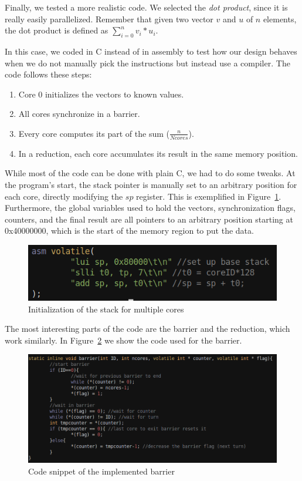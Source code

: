 Finally, we tested a more realistic code.
We selected the \textit{dot product}, since it is really easily parallelized.
Remember that given two vector $v$ and $u$ of $n$ elements, the dot product is defined as $\sum_{i=0}^{n}{v_{i} * u_{i}}$.

In this case, we coded in C instead of in assembly to test how our design behaves when we do not manually pick the instructions but instead use a compiler.
The code follows these steps:
\begin{enumerate}
	\item Core 0 initializes the vectors to known values.
	\item All cores synchronize in a barrier.
	\item Every core computes its part of the sum ($\frac{n}{Ncores}$).
	\item In a reduction, each core accumulates its result in the same memory position.
\end{enumerate}

While most of the code can be done with plain C, we had to do some tweaks.
At the program's start, the stack pointer is manually set to an arbitrary position for each core, directly modifying the $sp$ register.
This is exemplified in Figure~\ref{stackfig}.
Furthermore, the global variables used to hold the vectors, synchronization flags, counters, and the final result are all pointers to an arbitrary position starting at 0x40000000, which is the start of the memory region to put the data.

\begin{figure}[h!]
    \centering
    \includegraphics[width=.6\textwidth]{images/stack_ini.png}
    \caption{Initialization of the stack for multiple cores}
    \label{stackfig}
\end{figure}

The most interesting parts of the code are the barrier and the reduction, which work similarly.
In Figure~\ref{barrier} we show the code used for the barrier.

\begin{figure}[h!]
    \centering
    \includegraphics[width=.9\textwidth]{images/barrier.png}
    \caption{Code snippet of the implemented barrier}
    \label{barrier}
\end{figure}

